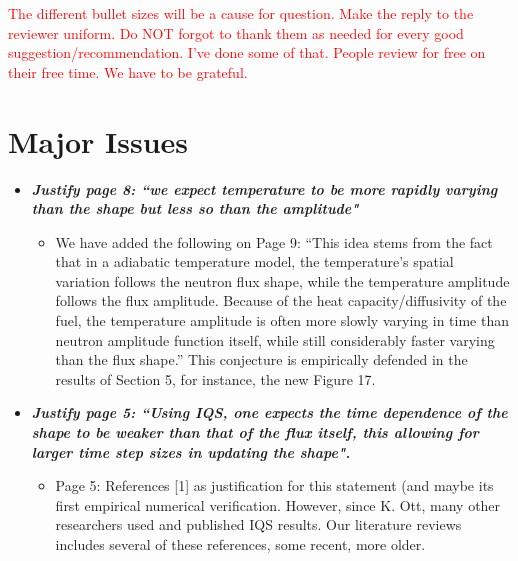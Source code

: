 \documentclass{elsarticle}
\newcommand{\done}{\checkmark}
\newcommand{\easy}[1]{\textbf{\textit{#1}}}
\newcommand{\medm}[1]{\textbf{\textit{#1}}}
\newcommand{\tcr}[1]{\textcolor{red}{#1}}
\begin{document}

\tcr{The different bullet sizes will be a cause for question. Make the reply to the reviewer uniform. Do NOT forgot to thank them as needed for every good suggestion/recommendation. I've done some of that. People review for free on their free time. We have to be grateful.}
\section*{Major Issues}

\begin{itemize}

\item[\done] \medm{ Justify page 8: ``we expect temperature to be more rapidly varying than the shape but less so than the amplitude" }
\begin{itemize}
\item We have added the following on Page 9: ``This idea stems from the fact that in a adiabatic temperature model, the temperature's spatial variation follows the neutron flux shape, while the temperature amplitude follows the flux amplitude. Because of the heat capacity/diffusivity of the fuel, the temperature amplitude is often more slowly varying in time than neutron amplitude function itself, while still considerably faster varying than the flux shape.'' This conjecture is empirically defended in the results of Section 5, for instance, the new Figure 17.
\end{itemize}

\item[\done] \easy{ Justify page 5: ``Using IQS, one expects the time dependence of the shape to be weaker than that of the flux itself, this allowing for larger time step sizes in updating the shape". }
\begin{itemize}
\item Page 5: References [1] as justification for this statement (and maybe its first empirical numerical verification. However, since K. Ott, many other researchers used and published IQS results. Our literature reviews includes several of these references, some recent, more older.
\end{itemize}


\end{itemize}
\end{document}
